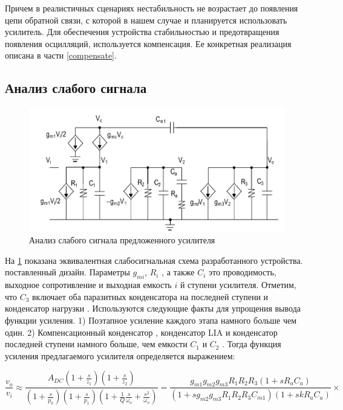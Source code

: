 \documentclass[a4paper,12pt]{article} %
\begin{document}
Причем в реалистичных сценариях нестабильность не возрастает до появления цепи обратной связи, с которой в нашем случае и планируется использовать усилитель. Для обеспечения устройства стабильностью и предотвращения появления осцилляций, используется компенсация. Ее конкретная реализация описана в части \ref{compensate}.

\subsection{Анализ слабого сигнала }

\begin{figure}[H]
    \includegraphics[width=\textwidth]{small_signal.png}
    \caption{Анализ слабого сигнала предложенного усилителя}
    \label{pic:small_signal}
\end{figure}

На \ref{pic:small_signal} показана эквивалентная слабосигнальная  схема разработанного   устройства. поставленный дизайн. Параметры $g_{mi}$, $ R_i $ , а также $ C_i $ это проводимость, выходное сопротивление и выходная емкость $i$ й ступени усилителя. Отметим, что $C_3$ включает оба паразитных конденсатора на последней ступени и конденсатор нагрузки . Используются следующие факты для упрощения вывода функции усиления. 
1) Поэтапное усиление каждого этапа намного больше чем один. 2) Компенсационный конденсатор , конденсатор LIA и конденсатор последней ступени намного больше, чем  емкости $ C_1 $ и $ C_2 $ . Тогда функция усиления предлагаемого усилителя определяется выражением:


$$ \frac{v_{o}}{v_{i}}\approx\frac{A_{DC}\left(1+\frac{s}{z_{1}}\right)\left(1+\frac{s}{z_{2}}\right)}{\left(1+\frac{s}{p_{0}}\right)\left(1+\frac{s}{p_{1}}\right)\left(1+\frac{1}{Q}\frac{s}{\omega_{o}}+\frac{s^{2}}{\omega_{o}}\right)}=\frac{g_{m1}g_{m2}g_{m3}R_{1}R_{2}R_{3}\left(1+sR_{a}C_{a}\right)}{\left(1+sg_{m2}g_{m3}R_{1}R_{2}R_{3}C_{m1}\right)\left(1+skR_{a}C_{a}\right)}\times $$ 
\end{document}
